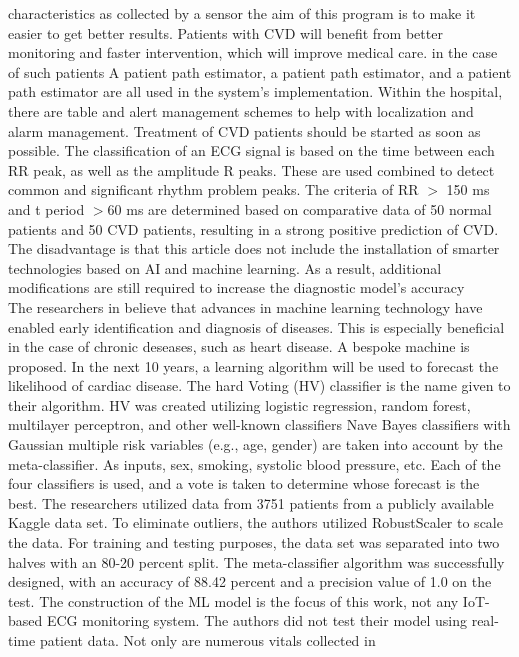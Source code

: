 \documentclass{bmcart}
\begin{document}
characteristics as collected by a sensor the aim of this program is to make it
easier to get better results. Patients with CVD will benefit from better
monitoring and faster intervention, which will improve medical care. in the case
of such patients A patient path estimator, a patient path estimator, and a
patient path estimator are all used in the system's implementation.  Within the
hospital, there are table and alert management schemes to help with localization
and alarm management. Treatment of CVD patients should be started as soon as
possible. The classification of an ECG signal is based on the time between each
RR peak, as well as the amplitude R peaks. These are used combined to detect
common and significant rhythm problem peaks. The criteria of RR $>$ 150 ms and t
period $>$60 ms are determined based on comparative data of 50 normal patients
and 50 CVD patients, resulting in a strong positive prediction of CVD. The
disadvantage is that this article does not include the installation of smarter
technologies based on AI and machine learning. As a result, additional
modifications are still required to increase the diagnostic model's accuracy\\
The researchers in \cite{9350514} believe that advances in machine learning
technology have enabled early identification and diagnosis of diseases. This is
especially beneficial in the case of chronic deseases, such as heart disease. A
bespoke machine is proposed. In the next 10 years, a learning
algorithm will be used to forecast the likelihood of cardiac disease. The hard
Voting (HV) classifier is the name given to their algorithm. HV was created
utilizing logistic regression, random forest, multilayer perceptron, and other
well-known classifiers  Nave Bayes classifiers with Gaussian multiple risk
variables (e.g., age, gender) are taken into account by the meta-classifier. As
inputs, sex, smoking, systolic blood pressure, etc. Each of the four
classifiers is used, and  a vote is taken to determine whose forecast is the
best. The researchers utilized data from 3751 patients from a publicly available
Kaggle data set. To eliminate outliers, the authors utilized RobustScaler
to scale the data. For training and testing purposes, the data set was separated
into two halves with an 80-20 percent split. The meta-classifier algorithm was
successfully designed, with an accuracy of 88.42 percent and a precision value
of 1.0 on the test. The construction of the ML model is the focus of this
work, not any IoT-based ECG monitoring system. The authors did not test their
model using real-time patient data. Not only are numerous vitals collected in
\end{document}
